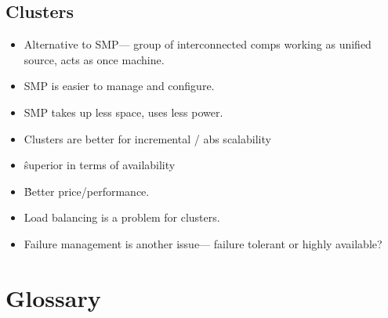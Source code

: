 \documentclass[fontsize=4.5pt]{scrartcl}
\begin{document}
\begin{multicols}{3}
      \subsection{Clusters}
        \begin{itemize}
          \item Alternative to SMP--- group of interconnected comps working as unified source, acts as once machine.
          \item SMP is easier to manage and configure.
          \item SMP takes up less space, uses less power.
          \item Clusters are better for incremental / abs scalability
          \item \^ superior in terms of availability
          \item \^ Better price/performance.
          \item Load balancing is a problem for clusters.
          \item Failure management is another issue--- failure tolerant or highly available?
        \end{itemize}


  \section{Glossary}

\end{multicols}
\end{document}
